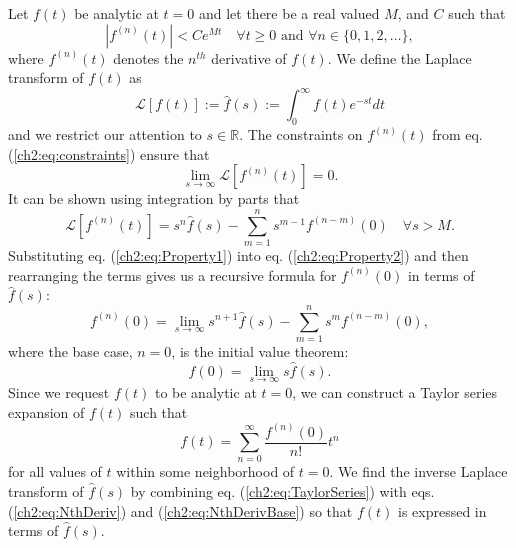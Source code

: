 Let $f(t)$ be analytic at $t=0$ and let there be a real valued $M$,
and $C$ such that
\begin{equation}\label{ch2:eq:constraints}
\left|f^{(n)}(t)\right| < Ce^{Mt}\quad \forall t\geq 0\text{ and }\forall n\in\{0,1,2,\dots\},
\end{equation}
where $f^{(n)}(t)$ denotes the $n^{th}$ derivative of $f(t)$.  We
define the Laplace transform of $f(t)$ as
\begin{equation}
\mathcal{L}[f(t)] := \hat{f}(s) := \int_{0}^\infty f(t)e^{-st}dt
\end{equation}
and we restrict our attention to $s\in\mathbb{R}$.  The constraints on
$f^{(n)}(t)$ from eq. (\ref{ch2:eq:constraints}) ensure that
\begin{equation}\label{ch2:eq:Property2}
\lim_{s \to \infty}\mathcal{L}[f^{(n)}(t)] = 0.
\end{equation}
It can be shown using integration by parts that
\begin{equation}\label{ch2:eq:Property1}
\mathcal{L}[f^{(n)}(t)] = s^n\hat{f}(s) - \sum_{m=1}^ns^{m-1}f^{(n-m)}(0) \quad \forall s>M.
\end{equation}
Substituting eq. (\ref{ch2:eq:Property1}) into eq.
(\ref{ch2:eq:Property2}) and then rearranging the terms gives us a
recursive formula for $f^{(n)}(0)$ in terms of $\hat{f}(s)$:
\begin{equation}\label{ch2:eq:NthDeriv}
f^{(n)}(0) = \lim_{s \to \infty} s^{n + 1}\hat{f}(s) -
             \sum_{m=1}^{n} s^{m}f^{(n-m)}(0),
\end{equation}
where the base case, $n=0$, is the initial value theorem:
\begin{equation}\label{ch2:eq:NthDerivBase}
f(0) = \lim_{s \to \infty} s\hat{f}(s).
\end{equation}
Since we request $f(t)$ to be analytic at $t=0$, we can construct a
Taylor series expansion of $f(t)$ such that
\begin{equation}\label{ch2:eq:TaylorSeries}
f(t) = \sum_{n=0}^\infty\frac{f^{(n)}(0)}{n!}t^n
\end{equation}
for all values of $t$ within some neighborhood of $t=0$. We find the
inverse Laplace transform of $\hat{f}(s)$ by combining
eq. (\ref{ch2:eq:TaylorSeries}) with eqs. (\ref{ch2:eq:NthDeriv}) and
(\ref{ch2:eq:NthDerivBase}) so that $f(t)$ is expressed in terms of
$\hat{f}(s)$.

